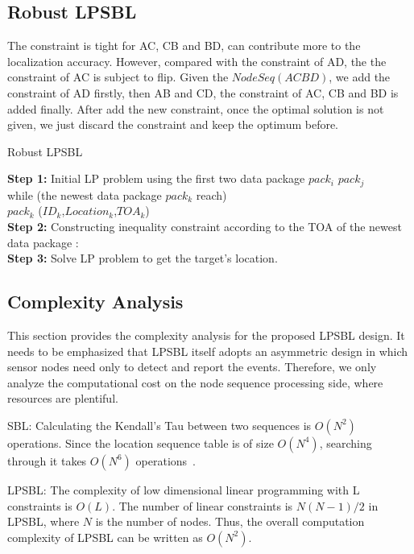  
 \subsection{Robust LPSBL}
 
 The constraint is tight for AC, CB and BD, can contribute more to the localization accuracy. 
 However, compared with the constraint of AD, the the constraint of AC is subject to flip.
 Given the $NodeSeq (A C B D)$, we add the constraint of AD firstly, then AB and CD,  the constraint of AC, CB and BD is added finally.
 After add the new constraint, once the optimal solution is not given, we just discard the constraint and keep the optimum before.

\begin{algorithm}
\caption{Robust LPSBL}
 
 \textbf{Step 1:}  Initial LP problem using the first two data package $pack_i$ $pack_j$ \\
          while (the newest data package $pack_k$ reach)\\		 
		   $pack_k$ ($ID_k$,$Location_k$,$TOA_k$)\\
\textbf{Step 2:}  Constructing inequality constraint according to the TOA of the newest data package : \\ 

\textbf{Step 3:} Solve LP problem to get the target's location.\\
       
 
 \end{algorithm}
 
\subsection{Complexity Analysis}
This section provides the complexity analysis for the proposed
LPSBL design. It needs to be emphasized that
LPSBL itself adopts an asymmetric design in which sensor
nodes need only to detect and report the events. Therefore,
we only analyze the computational cost on the node sequence
processing side, where resources are plentiful.

SBL: Calculating the Kendall’s Tau
between two sequences is $O(N^2)$ operations. Since the location sequence table is of size
$O(N^4)$, searching through it takes $O(N^6)$ operations~\cite{yedavalli2008sequence}.

LPSBL: The complexity of low dimensional linear programming
with L constraints is $O(L)$\cite{Griva2009}. The number of linear constraints is $N(N-1)/2$ in LPSBL,
where $N$ is the number of nodes. Thus, the overall computation
complexity of LPSBL can be written as $O(N^2)$.



